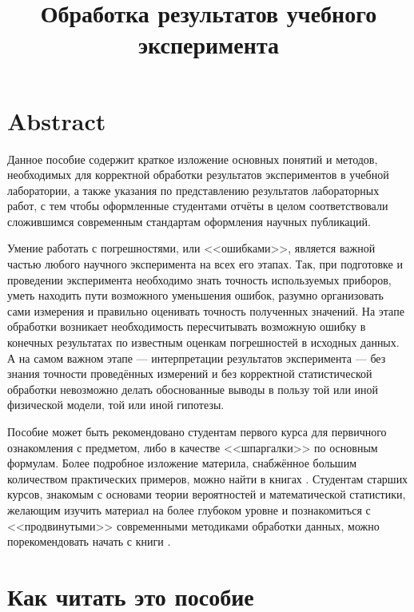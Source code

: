 \documentclass[oneside]{book}
\begin{document}
\title{Обработка результатов учебного эксперимента}


\maketitle
\tableofcontents

\listoftodos

\chapter*{Abstract}
    Данное пособие содержит краткое изложение основных понятий и методов,
    необходимых для корректной обработки результатов экспериментов в учебной
    лаборатории, а также указания по представлению результатов лабораторных
    работ, с тем чтобы оформленные студентами отчёты в целом соответствовали
    сложившимся современным стандартам оформления научных публикаций.
    
    Умение работать с погрешностями, или <<ошибками>>,
    является важной частью любого научного эксперимента на всех его этапах.
    Так, при подготовке и проведении эксперимента необходимо знать точность
    используемых приборов, уметь находить пути возможного уменьшения ошибок,
    разумно организовать сами измерения и правильно оценивать точность
    полученных значений. На этапе обработки возникает необходимость пересчитывать
    возможную ошибку в конечных результатах по известным оценкам погрешностей
    в исходных данных. А на самом важном этапе --- интерпретации
    результатов эксперимента --- без знания точности проведённых
    измерений и без корректной статистической обработки невозможно делать
    обоснованные выводы в пользу той или иной физической модели, той или
    иной гипотезы. 
    
    Пособие может быть рекомендовано студентам первого курса для первичного
    ознакомления с предметом, либо в качестве <<шпаргалки>>
    по основным формулам. Более подробное изложение материла, снабжённое
    большим количеством практических примеров, можно найти в книгах
    \cite{taylor,squires,zaidel}. Студентам старших курсов, знакомым
    с основами теории вероятностей и математической статистики, желающим
    изучить материал на более глубоком уровне и познакомиться с <<продвинутыми>>
    современными методиками обработки данных, можно порекомендовать начать
    с книги \cite{hudson}.
\chapter*{Как читать это пособие}
\end{document}
